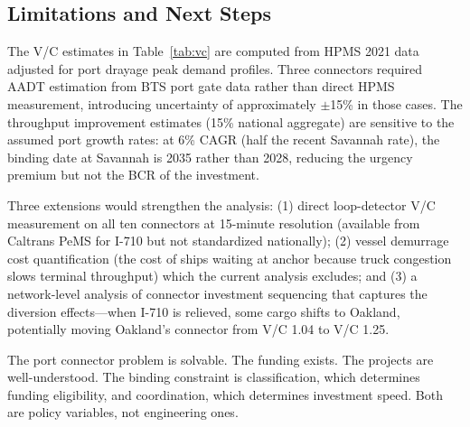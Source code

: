 \subsection{Limitations and Next Steps}

The V/C estimates in Table~\ref{tab:vc} are computed from HPMS 2021 data \citep{HPMS2018} adjusted for port drayage peak demand profiles. Three connectors required AADT estimation from BTS port gate data rather than direct HPMS measurement, introducing uncertainty of approximately $\pm$15\% in those cases. The throughput improvement estimates (15\% national aggregate) are sensitive to the assumed port growth rates: at 6\% CAGR (half the recent Savannah rate), the binding date at Savannah is 2035 rather than 2028, reducing the urgency premium but not the BCR of the investment.

Three extensions would strengthen the analysis: (1) direct loop-detector V/C measurement on all ten connectors at 15-minute resolution (available from Caltrans PeMS for I-710 but not standardized nationally); (2) vessel demurrage cost quantification (the cost of ships waiting at anchor because truck congestion slows terminal throughput) which the current analysis excludes; and (3) a network-level analysis of connector investment sequencing that captures the diversion effects---when I-710 is relieved, some cargo shifts to Oakland, potentially moving Oakland's connector from V/C 1.04 to V/C 1.25.

The port connector problem is solvable. The funding exists. The projects are well-understood. The binding constraint is classification, which determines funding eligibility, and coordination, which determines investment speed. Both are policy variables, not engineering ones.
